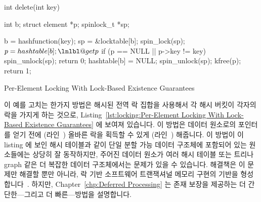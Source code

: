 \fi

\begin{listing}[tbp]
\begin{fcvlabel}
\begin{VerbatimL}[commandchars=\\\@\$]
int delete(int key)
{
	int b;
	struct element *p;
	spinlock_t *sp;

	b = hashfunction(key);
	sp = &locktable[b];
	spin_lock(sp);				\lnlbl@acq$
	p = hashtable[b];			\lnlbl@getp$
	if (p == NULL || p->key != key) {
		spin_unlock(sp);
		return 0;
	}
	hashtable[b] = NULL;
	spin_unlock(sp);
	kfree(p);
	return 1;
}
\end{VerbatimL}
\end{fcvlabel}
\caption{Per-Element Locking With Lock-Based Existence Guarantees}
\label{lst:locking:Per-Element Locking With Lock-Based Existence Guarantees}
\end{listing}

\begin{fcvref}
이 예를 고치는 한가지 방법은 해시된 전역 락 집합을 사용해서 각 해시 버킷이
각자의 락을 가지게 하는 것으로,
Listing~\ref{lst:locking:Per-Element Locking With Lock-Based Existence Guarantees}
에 보여져 있습니다.
이 방법은 데이터 원소로의 포인터를 얻기 전에 (라인~) 올바른 락을
획득할 수 있게 (라인~) 해줍니다.
이 방법이 이 listing 에 보인 해시 테이블과 같이 단일 분할 가능 데이터 구조체에
포함되어 있는 원소들에는 상당히 잘 동작하지만, 주어진 데이터 원소가 여러 해시
테이블 또는 트리나 graph 같은 더 복잡한 데이터 구조체에서는 문제가 있을 수
있습니다.
해결책은 이 문제만 해결할 뿐만 아니라, 락 기반 소프트웨어 트랜잭셔널 메모리
구현의 기반을 형성합니다~\cite{Shavit95,DaveDice2006DISC}.
하지만,
Chapter~\ref{chp:Deferred Processing} 는 존재 보장을 제공하는 더
간단한---그리고 더 빠른---방법을 설명합니다.
\end{fcvref}

\iffalse

\begin{fcvref}[ln:locking:Per-Element Locking With Lock-Based Existence Guarantees]
One way to fix this example is to use a hashed set of global locks, so
that each hash bucket has its own lock, as shown in
Listing~\ref{lst:locking:Per-Element Locking With Lock-Based Existence Guarantees}.
This approach allows acquiring the proper lock (on line~\lnref{acq}) before
gaining a pointer to the data element (on line~\lnref{getp}).
Although this approach works quite well for elements contained in a
single partitionable data structure such as the hash table shown in the
listing, it can be problematic if a given data element can be a member
of multiple hash tables or given more-complex data structures such
as trees or graphs.
Not only can these problems be solved, but the solutions also form
the basis of lock-based software transactional memory
implementations~\cite{Shavit95,DaveDice2006DISC}.
However,
Chapter~\ref{chp:Deferred Processing}
describes simpler---and faster---ways of providing existence guarantees.
\end{fcvref}

\fi

